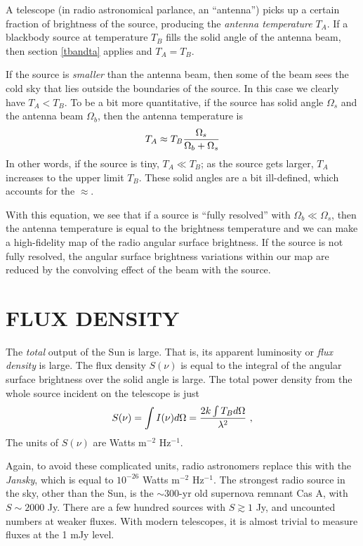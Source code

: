 \documentclass[12pt,psfig,preprint]{aastex}
\begin{document}
	A telescope (in radio astronomical parlance, an ``antenna'')
picks up a certain fraction of brightness of the source, producing the
{\it antenna temperature} $T_A$.  If a blackbody source at temperature
$T_B$ fills the solid angle of the antenna beam, then  section
\ref{tbandta} applies and $T_A = T_B$. 

	If the source is {\it smaller} than the antenna beam, then some
of the beam sees the cold sky that lies outside the boundaries of the
source.  In this case we clearly have $T_A < T_B$.  To be a bit more
quantitative, if the source has solid angle $\Omega _s$ and the antenna
beam $\Omega _b$, then the antenna temperature is 
%
\begin{equation}
\label{eqfour}
T_A \approx T_B {\Omega _s \over \Omega _b + \Omega _s}
\end{equation}
%
\noindent In other words, if the source is tiny, $T_A \ll T_B$; as the
source gets larger, $T_A$ increases to the upper limit $T_B$.  These
solid angles are a bit ill-defined, which accounts for the $\approx$. 

With this equation, we see that if a source is ``fully resolved'' with
$\Omega_b \ll \Omega_s$, then the antenna temperature is equal to the
brightness temperature and we can make a high-fidelity map of the radio
angular surface brightness. If the source is not fully resolved, the
angular surface brightness variations within our map are reduced by the
convolving effect of the beam with the source.

\section {FLUX DENSITY} \label{fluxdensity}

	The {\it total} output of the Sun is large. That is, its
apparent luminosity or {\it flux density} is large. The flux density
$S(\nu)$ is equal to the integral of the  angular surface brightness
over the solid angle is large.  The total power density from the whole
source  incident on the telescope is just
%
\begin{equation} 
\label{eqfive}
S(\nu) = \int I(\nu) d\Omega = {2 k \int T_B d\Omega
\over \lambda^2} \ ,
\end{equation}
%
\noindent The units of $S(\nu)$ are Watts m$^{-2}$ Hz$^{-1}$.  

	Again, to avoid these complicated units, radio astronomers
replace this with the {\it Jansky}, which is equal to $10^{-26}$ Watts
m$^{-2}$ Hz$^{-1}$. The strongest radio source in the sky, other than
the Sun, is the $\sim 300$-yr old supernova remnant Cas A, with $S \sim
2000$ Jy. There are a few hundred sources with $S \gtrsim 1$ Jy, and
uncounted numbers at weaker fluxes. With modern telescopes, it is almost
trivial to measure fluxes at the 1 mJy level. 
\end{document}
